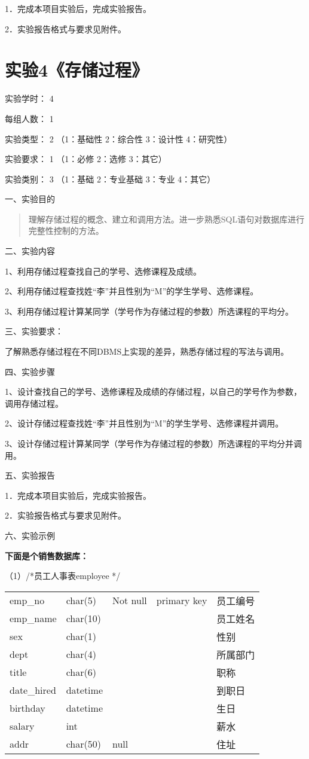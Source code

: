 \documentclass[
]{article}
\begin{document}
1．完成本项目实验后，完成实验报告。

2．实验报告格式与要求见附件。

\hypertarget{ux5b9eux9a8c4ux5b58ux50a8ux8fc7ux7a0b}{%
\section{实验4《存储过程》}\label{ux5b9eux9a8c4ux5b58ux50a8ux8fc7ux7a0b}}

实验学时： { 4}

每组人数： { 1}

实验类型： { 2} （1：基础性 2：综合性 3：设计性 4：研究性）

实验要求： { 1} （1：必修 2：选修 3：其它）

实验类别： { 3} （1：基础 2：专业基础 3：专业 4：其它）

{}

一、实验目的

\begin{quote}
理解存储过程的概念、建立和调用方法。进一步熟悉SQL语句对数据库进行完整性控制的方法。
\end{quote}

二、实验内容

1、利用存储过程查找自己的学号、选修课程及成绩。

2、利用存储过程查找姓``李''并且性别为``M''的学生学号、选修课程。

3、利用存储过程计算某同学（学号作为存储过程的参数）所选课程的平均分。

三、实验要求：

了解熟悉存储过程在不同DBMS上实现的差异，熟悉存储过程的写法与调用。

四、实验步骤

1、设计查找自己的学号、选修课程及成绩的存储过程，以自己的学号作为参数，调用存储过程。

2、设计存储过程查找姓``李''并且性别为``M''的学生学号、选修课程并调用。

3、设计存储过程计算某同学（学号作为存储过程的参数）所选课程的平均分并调用。

五、实验报告

1．完成本项目实验后，完成实验报告。

2．实验报告格式与要求见附件。

六、实验示例

\textbf{下面是个销售数据库：}

（1）/*员工人事表employee */

\begin{longtable}[]{@{}lllll@{}}
\toprule
\endhead
emp\_no & char(5) & Not null & primary key & 员工编号\tabularnewline
emp\_name & char(10) & & & 员工姓名\tabularnewline
sex & char(1) & & & 性别\tabularnewline
dept & char(4) & & & 所属部门\tabularnewline
title & char(6) & & & 职称\tabularnewline
date\_hired & datetime & & & 到职日\tabularnewline
birthday & datetime & & & 生日\tabularnewline
salary & int & & & 薪水\tabularnewline
addr & char(50) & null & & 住址\tabularnewline
\bottomrule
\end{longtable}
\end{document}
